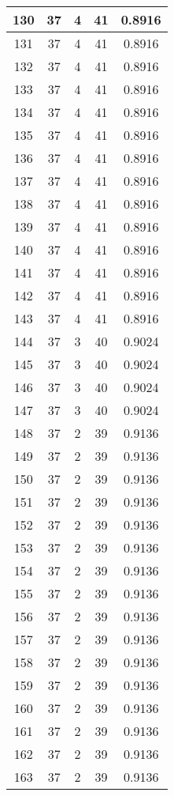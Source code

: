 \documentclass[letterpaper, 12pt]{article}
\begin{document}
\begin{longtable}{|c|c|c|c|c|}
\hline
130 & 37 & 4 & 41 & 0.8916 \\
\hline
131 & 37 & 4 & 41 & 0.8916 \\
\hline
132 & 37 & 4 & 41 & 0.8916 \\
\hline
133 & 37 & 4 & 41 & 0.8916 \\
\hline
134 & 37 & 4 & 41 & 0.8916 \\
\hline
135 & 37 & 4 & 41 & 0.8916 \\
\hline
136 & 37 & 4 & 41 & 0.8916 \\
\hline
137 & 37 & 4 & 41 & 0.8916 \\
\hline
138 & 37 & 4 & 41 & 0.8916 \\
\hline
139 & 37 & 4 & 41 & 0.8916 \\
\hline
140 & 37 & 4 & 41 & 0.8916 \\
\hline
141 & 37 & 4 & 41 & 0.8916 \\
\hline
142 & 37 & 4 & 41 & 0.8916 \\
\hline
143 & 37 & 4 & 41 & 0.8916 \\
\hline
144 & 37 & 3 & 40 & 0.9024 \\
\hline
145 & 37 & 3 & 40 & 0.9024 \\
\hline
146 & 37 & 3 & 40 & 0.9024 \\
\hline
147 & 37 & 3 & 40 & 0.9024 \\
\hline
148 & 37 & 2 & 39 & 0.9136 \\
\hline
149 & 37 & 2 & 39 & 0.9136 \\
\hline
150 & 37 & 2 & 39 & 0.9136 \\
\hline
151 & 37 & 2 & 39 & 0.9136 \\
\hline
152 & 37 & 2 & 39 & 0.9136 \\
\hline
153 & 37 & 2 & 39 & 0.9136 \\
\hline
154 & 37 & 2 & 39 & 0.9136 \\
\hline
155 & 37 & 2 & 39 & 0.9136 \\
\hline
156 & 37 & 2 & 39 & 0.9136 \\
\hline
157 & 37 & 2 & 39 & 0.9136 \\
\hline
158 & 37 & 2 & 39 & 0.9136 \\
\hline
159 & 37 & 2 & 39 & 0.9136 \\
\hline
160 & 37 & 2 & 39 & 0.9136 \\
\hline
161 & 37 & 2 & 39 & 0.9136 \\
\hline
162 & 37 & 2 & 39 & 0.9136 \\
\hline
163 & 37 & 2 & 39 & 0.9136 \\

\end{longtable}
\end{document}
